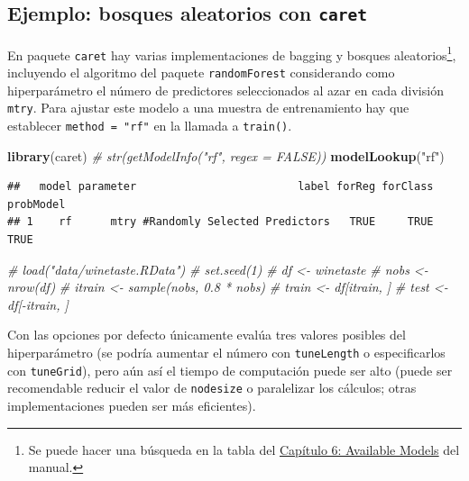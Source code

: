 \documentclass[]{book}
\newenvironment{Shaded}{\begin{snugshade}}{\end{snugshade}}
\newcommand{\KeywordTok}[1]{\textcolor[rgb]{0.13,0.29,0.53}{\textbf{#1}}}
\newcommand{\StringTok}[1]{\textcolor[rgb]{0.31,0.60,0.02}{#1}}
\newcommand{\CommentTok}[1]{\textcolor[rgb]{0.56,0.35,0.01}{\textit{#1}}}
\newcommand{\NormalTok}[1]{#1}
\theoremstyle{break}
\theoremstyle{definition}
\theoremstyle{definition}
\theoremstyle{definition}
\theoremstyle{remark}
\begin{document}
\subsection{\texorpdfstring{Ejemplo: bosques aleatorios con
\texttt{caret}}{Ejemplo: bosques aleatorios con caret}}\label{ejemplo-bosques-aleatorios-con-caret}

En paquete \texttt{caret} hay varias implementaciones de bagging y
bosques aleatorios\footnote{Se puede hacer una búsqueda en la tabla del
  \href{https://topepo.github.io/caret/available-models.html}{Capítulo
  6: Available Models} del manual.}, incluyendo el algoritmo del paquete
\texttt{randomForest} considerando como hiperparámetro el número de
predictores seleccionados al azar en cada división \texttt{mtry}. Para
ajustar este modelo a una muestra de entrenamiento hay que establecer
\texttt{method\ =\ "rf"} en la llamada a \texttt{train()}.

\begin{Shaded}
\begin{Highlighting}[]
\KeywordTok{library}\NormalTok{(caret)}
\CommentTok{# str(getModelInfo("rf", regex = FALSE))}
\KeywordTok{modelLookup}\NormalTok{(}\StringTok{"rf"}\NormalTok{)}
\end{Highlighting}
\end{Shaded}

\begin{verbatim}
##   model parameter                         label forReg forClass probModel
## 1    rf      mtry #Randomly Selected Predictors   TRUE     TRUE      TRUE
\end{verbatim}

\begin{Shaded}
\begin{Highlighting}[]
\CommentTok{# load("data/winetaste.RData")}
\CommentTok{# set.seed(1)}
\CommentTok{# df <- winetaste}
\CommentTok{# nobs <- nrow(df)}
\CommentTok{# itrain <- sample(nobs, 0.8 * nobs)}
\CommentTok{# train <- df[itrain, ]}
\CommentTok{# test <- df[-itrain, ]}
\end{Highlighting}
\end{Shaded}

Con las opciones por defecto únicamente evalúa tres valores posibles del
hiperparámetro (se podría aumentar el número con \texttt{tuneLength} o
especificarlos con \texttt{tuneGrid}), pero aún así el tiempo de
computación puede ser alto (puede ser recomendable reducir el valor de
\texttt{nodesize} o paralelizar los cálculos; otras implementaciones
pueden ser más eficientes).
\end{document}

